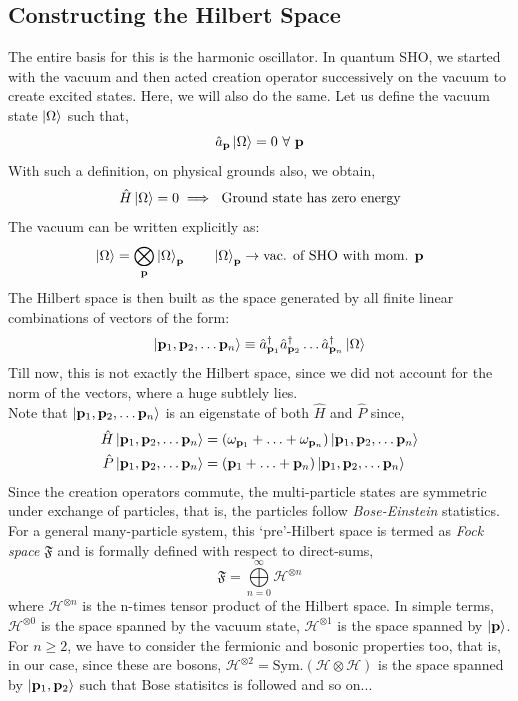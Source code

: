 \subsection{Constructing the Hilbert Space}
The entire basis for this is the harmonic oscillator. In quantum SHO, we started with the vacuum and then acted creation operator successively on the vacuum to create excited states. Here, we will also do the same. Let us define the vacuum state $\ket{\Omega}$ such that,
$$\hat{a}_{\vb{p}}\ket{\Omega} = 0\ \forall \ \vb{p}$$
With such a definition, on physical grounds also, we obtain,
$$\hat{H}\ket{\Omega} = 0\implies \ \text{Ground state has zero energy}$$
The vacuum can be written explicitly as:
$$\ket{\Omega} = \bigotimes\limits_{\vb{p}} \ket{\Omega}_{\vb{p}} \qquad  \ket{\Omega}_{\vb{p}} \rightarrow \text{vac. of SHO with mom. $\vb{p}$}$$
The Hilbert space is then built as the space generated by all finite linear combinations of vectors of the form: 
$$\ket{\vb{p}_1, \vb{p}_2,\ldots \vb{p}_n} \equiv \hat{a}_{\vb{p}_1}^\dagger\hat{a}_{\vb{p}_2}^\dagger\ldots\hat{a}_{\vb{p}_n}^\dagger\ket{\Omega} $$
Till now, this is not exactly the Hilbert space, since we did not account for the norm of the vectors, where a huge subtlely lies. \\[0.2cm]
Note that $\ket{\vb{p}_1, \vb{p}_2,\ldots \vb{p}_n}$ is an eigenstate of both $\hat{H}$ and $\hat{P}$ since,
\begin{align*}
    \hat{H}\ket{\vb{p}_1, \vb{p}_2,\ldots \vb{p}_n} &= (\omega_{\vb{p}_1} +\ldots+\omega_{\vb{p}_n})\ket{\vb{p}_1, \vb{p}_2,\ldots \vb{p}_n}\\
    \hat{P}\ket{\vb{p}_1, \vb{p}_2,\ldots \vb{p}_n} &= (\vb{p}_1+\ldots+\vb{p}_n)\ket{\vb{p}_1, \vb{p}_2,\ldots \vb{p}_n}
\end{align*}
Since the creation operators commute, the multi-particle states are symmetric under exchange of
particles, that is, the particles follow \textit{Bose-Einstein} statistics.\\[0.2cm] For a general many-particle system, this `pre'-Hilbert space is termed as \textit{Fock space} $\mathfrak{F}$ and is formally defined with respect to direct-sums,
$$\mathfrak{F} = \bigoplus\limits_{n=0}^\infty \mathscr{H}^{\otimes n}$$
where $\mathscr{H}^{\otimes n}$ is the n-times tensor product of the Hilbert space. In simple terms, $\mathscr{H}^{\otimes 0}$ is the space spanned by the vacuum state, $\mathscr{H}^{\otimes 1}$ is the space spanned by $\ket{\vb{p}}$. For $n\geq 2$, we have to consider the fermionic and bosonic properties too, that is, in our case, since these are bosons,  $\mathscr{H}^{\otimes 2} = \mathrm{Sym.} (\mathscr{H}\otimes \mathscr{H})$ is the space spanned by $\ket{\vb{p}_1, \vb{p}_2}$ such that Bose statisitcs is followed  and so on... 